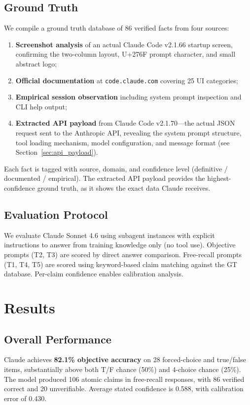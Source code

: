\documentclass[10pt,twocolumn]{article}
\begin{document}
\subsection{Ground Truth}
We compile a ground truth database of 86 verified facts from four sources:
\begin{enumerate}
  \item \textbf{Screenshot analysis} of an actual Claude Code v2.1.66 startup screen, confirming the two-column layout, U+276F prompt character, and small abstract logo;
  \item \textbf{Official documentation} at \texttt{code.claude.com} covering 25 UI categories;
  \item \textbf{Empirical session observation} including system prompt inspection and CLI help output;
  \item \textbf{Extracted API payload} from Claude Code v2.1.70---the actual JSON request sent to the Anthropic API, revealing the system prompt structure, tool loading mechanism, model configuration, and message format (see Section~\ref{sec:api_payload}).
\end{enumerate}
Each fact is tagged with source, domain, and confidence level (definitive / documented / empirical).
The extracted API payload provides the highest-confidence ground truth, as it shows the exact data Claude receives.

\subsection{Evaluation Protocol}
We evaluate Claude Sonnet 4.6 using subagent instances with explicit instructions to answer from training knowledge only (no tool use).
Objective prompts (T2, T3) are scored by direct answer comparison.
Free-recall prompts (T1, T4, T5) are scored using keyword-based claim matching against the GT database.
Per-claim confidence enables calibration analysis.

\section{Results}

\subsection{Overall Performance}

Claude achieves \textbf{82.1\% objective accuracy} on 28 forced-choice and true/false items, substantially above both T/F chance (50\%) and 4-choice chance (25\%).
The model produced 106 atomic claims in free-recall responses, with 86 verified correct and 20 unverifiable.
Average stated confidence is 0.588, with calibration error of 0.430.
\end{document}
